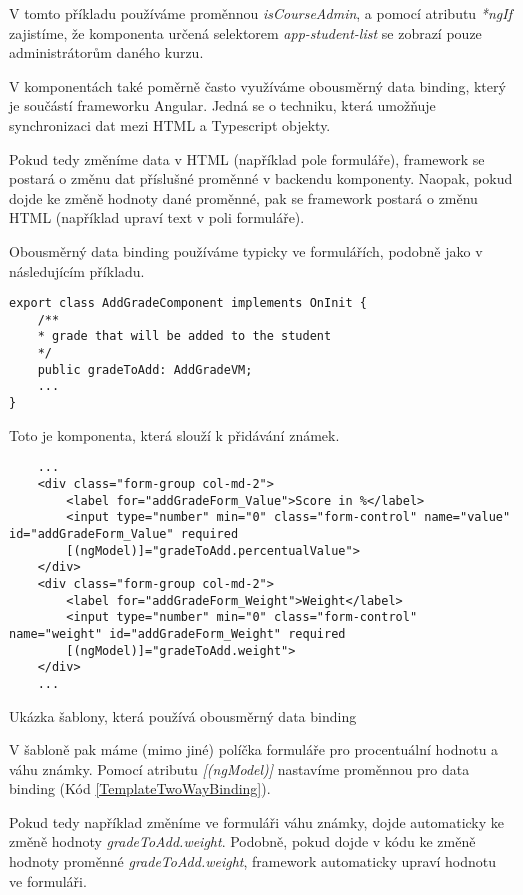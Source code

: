 V tomto příkladu používáme proměnnou \textit{isCourseAdmin}, a pomocí atributu \textit{*ngIf} zajistíme, že komponenta určená selektorem \textit{app-student-list} se zobrazí pouze administrátorům daného kurzu. 

\vspace{\baselineskip}

V komponentách také poměrně často využíváme obousměrný data binding, který je součástí frameworku Angular. Jedná se o techniku, která umožňuje synchronizaci dat mezi HTML a Typescript objekty.

Pokud tedy změníme data v HTML (například pole formuláře), framework se postará o změnu dat příslušné proměnné v backendu komponenty. Naopak, pokud dojde ke změně hodnoty dané proměnné, pak se framework postará o změnu HTML (například upraví text v poli formuláře). \cite{AngularDocs}

Obousměrný data binding používáme typicky ve formulářích, podobně jako v následujícím příkladu.

\lstset{style=typescript}
\begin{lstlisting}
export class AddGradeComponent implements OnInit {
	/**
	* grade that will be added to the student
	*/
	public gradeToAdd: AddGradeVM;
	...
}
\end{lstlisting}

Toto je komponenta, která slouží k přidávání známek. 

\lstset{style=html}
\begin{program}
	\begin{lstlisting}
	...
	<div class="form-group col-md-2">
		<label for="addGradeForm_Value">Score in %</label>
		<input type="number" min="0" class="form-control" name="value" id="addGradeForm_Value" required
		[(ngModel)]="gradeToAdd.percentualValue">
	</div>
	<div class="form-group col-md-2">
		<label for="addGradeForm_Weight">Weight</label>
		<input type="number" min="0" class="form-control" name="weight" id="addGradeForm_Weight" required
		[(ngModel)]="gradeToAdd.weight">
	</div>
	...
	\end{lstlisting}
	\caption{Ukázka šablony, která používá obousměrný data binding}
	\label{TemplateTwoWayBinding}
\end{program}

V šabloně pak máme (mimo jiné) políčka formuláře pro procentuální hodnotu a váhu známky.
Pomocí atributu \textit{[(ngModel)]} nastavíme proměnnou pro data binding (Kód \ref{TemplateTwoWayBinding}). 

Pokud tedy například změníme ve formuláři váhu známky, dojde automaticky ke změně hodnoty \textit{gradeToAdd.weight}. Podobně, pokud dojde v kódu ke změně hodnoty proměnné \textit{gradeToAdd.weight}, framework automaticky upraví hodnotu ve formuláři.

